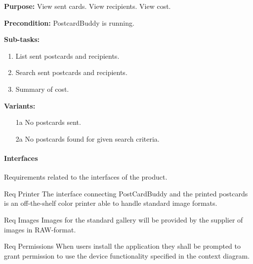 \documentclass[10pt,a4paper]{article}
\begin{document}
\begin {description}
\begin {description}
\item \textbf{Purpose:} View sent cards. View recipients. View cost.
\item \textbf{Precondition:} PostcardBuddy is running. 

\item \textbf{Sub-tasks:}
\begin{enumerate}
\item List sent postcards and recipients. 
\item Search sent postcards and recipients.
\item Summary of cost.  

\end{enumerate}
\item \textbf{Variants:}
\begin{itemize}[label={}]

\item[1a] No postcards sent. 
\item[2a] No postcards found for given search criteria. 

\end{itemize}
\end{description}
\end{description}



\paragraph{Interfaces}
Requirements related to the interfaces of the product.

\begin {description}
	\item [Req \thesubsubsection {.\theinterf} Printer] The interface connecting PostCardBuddy and the printed postcards is an off-the-shelf color printer able to handle standard image formats.

	\item [Req \thesubsubsection {.\theinterf} Images] Images for the standard gallery will be provided by the supplier of images in RAW-format.

	\item [Req \thesubsubsection {.\theinterf} Permissions] When users install the application they shall be prompted to grant permission to use the device functionality specified in the context diagram.  
\end{description}
\end{document}
